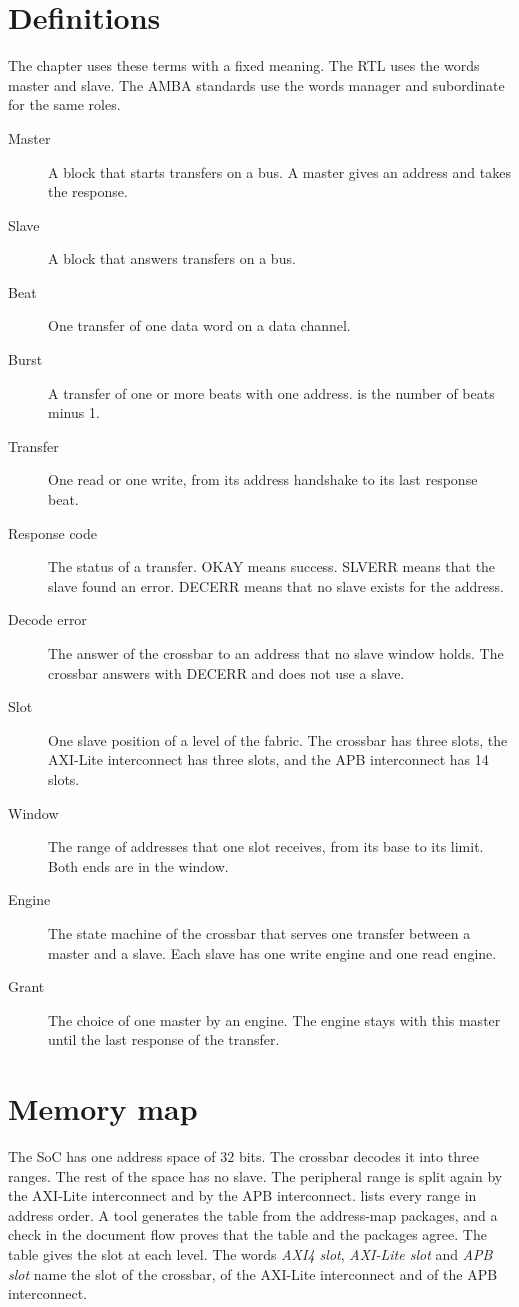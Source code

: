 \section{Definitions}\label{ds:ch:mod-bus-fabric:definitions}
The chapter uses these terms with a fixed meaning. The RTL uses the words master and slave. The AMBA standards use the words manager and subordinate for the same roles.
\begin{description}
  \item[Master] A block that starts transfers on a bus. A master gives an address and takes the response.
  \item[Slave] A block that answers transfers on a bus.
  \item[Beat] One transfer of one data word on a data channel.
  \item[Burst] A transfer of one or more beats with one address.  is the number of beats minus 1.
  \item[Transfer] One read or one write, from its address handshake to its last response beat.
  \item[Response code] The status of a transfer. OKAY means success. SLVERR means that the slave found an error. DECERR means that no slave exists for the address.
  \item[Decode error] The answer of the crossbar to an address that no slave window holds. The crossbar answers with DECERR and does not use a slave.
  \item[Slot] One slave position of a level of the fabric. The crossbar has three slots, the AXI-Lite interconnect has three slots, and the APB interconnect has 14 slots.
  \item[Window] The range of addresses that one slot receives, from its base to its limit. Both ends are in the window.
  \item[Engine] The state machine of the crossbar that serves one transfer between a master and a slave. Each slave has one write engine and one read engine.
  \item[Grant] The choice of one master by an engine. The engine stays with this master until the last response of the transfer.
\end{description}

\section{Memory map}\label{ds:ch:mod-bus-fabric:memory-map}
The SoC has one address space of 32 bits. The crossbar decodes it into three ranges. The rest of the space has no slave. The peripheral range is split again by the AXI-Lite interconnect and by the APB interconnect.  lists every range in address order. A tool generates the table from the address-map packages, and a check in the document flow proves that the table and the packages agree. The table gives the slot at each level. The words \emph{AXI4 slot}, \emph{AXI-Lite slot} and \emph{APB slot} name the slot of the crossbar, of the AXI-Lite interconnect and of the APB interconnect.

